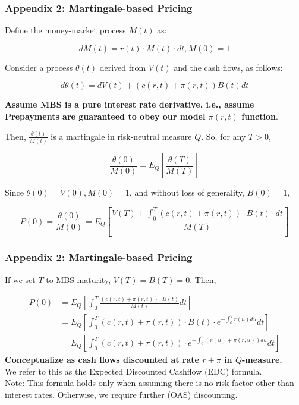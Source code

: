 \documentclass{beamer}
\begin{document}
\begin{frame}
\frametitle{Appendix 2: Martingale-based Pricing}
Define the money-market process $M(t)$ as:

$$dM(t) = r(t) \cdot M(t) \cdot dt, M(0) = 1$$

Consider a process $\theta(t)$ derived from $V(t)$ and the cash flows, as follows:

$$d\theta(t) = dV(t) + (c(r,t) + \pi(r,t)) B(t) dt$$

{\bf Assume MBS is a pure interest rate derivative, i.e., assume \\ Prepayments are guaranteed to obey our model $\pi(r,t)$ function}.

Then, $\frac {\theta(t)} {M(t)}$ is a martingale in risk-neutral measure $Q$. So, for any $T > 0$,

$$\frac {\theta(0)} {M(0)} = E_Q[\frac {\theta(T)} {M(T)}]$$

Since $\theta(0) = V(0), M(0) = 1$, and without loss of generality, $B(0) = 1$,

$$P(0) = \frac {\theta(0)} {M(0)} = E_Q[\frac {V(T) + \int_0^T (c(r,t) + \pi(r,t))\cdot B(t) \cdot dt} {M(T)}]$$

\end{frame}

\begin{frame}
\frametitle{Appendix 2: Martingale-based Pricing}

If we set $T$ to MBS maturity, $V(T) = B(T) = 0$. Then,

\begin{equation}
\begin{split}
P(0) & = E_Q[\int_0^T \frac {(c(r,t) + \pi(r,t)) \cdot B(t)} {M(t)} dt] \\
& = E_Q[\int_0^T (c(r,t) + \pi(r,t)) \cdot B(t) \cdot e^{-\int_0^u r(u) du} dt] \\
& = E_Q[\int_0^T (c(r,t) + \pi(r,t)) \cdot e^{-\int_0^u (r(u) +\pi(r, u)) du} dt]
\end{split}
\end{equation}
{\bf Conceptualize as cash flows discounted at rate $r + \pi$ in $Q$-measure.}\\
We refer to this as the Expected Discounted Cashflow (EDC) formula.\\
Note: This formula holds only when assuming there is no risk factor other than interest rates. Otherwise, we require further (OAS) discounting.

\end{frame}
\end{document}
